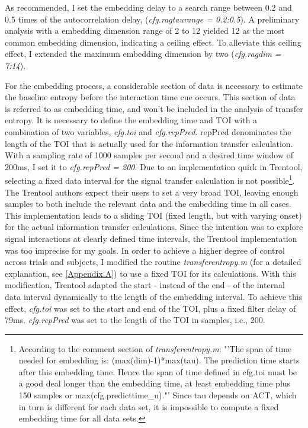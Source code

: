 As recommended, I set the embedding delay to a search range between 0.2 and 0.5 times of the autocorrelation delay, (\emph{cfg.ragtaurange = 0.2:0.5}).
A preliminary analysis with a embedding dimension range of 2 to 12 yielded 12 as the most common embedding dimension, indicating a ceiling effect.
To alleviate this ceiling effect, I extended the maximum embedding dimension by two (\emph{cfg.ragdim = 7:14}).

For the embedding process, a considerable section of data is necessary to estimate the baseline entropy before the interaction time cue occurs.
This section of data is referred to as embedding time, and won't be included in the analysis of transfer entropy.
It is necessary to define the embedding time and TOI with a combination of two variables, \emph{cfg.toi} and \emph{cfg.repPred}.
repPred denominates the length of the TOI that is actually used for the information transfer calculation.
With a sampling rate of 1000 samples per second and a desired time window of 200ms, I set it to \emph{cfg.repPred = 200}.
Due to an implementation quirk in Trentool, selecting a fixed data interval for the signal transfer calculation is not possible\footnote{According to the comment section of \emph{transferentropy.m}: "'The span of time needed for embedding is: (max(dim)-1)*max(tau). The prediction time starts after this embedding time. Hence the span of time defined in cfg.toi must be a good deal longer than the embedding time, at least embedding time plus 150 samples or max(cfg.predicttime\_u)."'
Since tau depends on ACT, which in turn is different for each data set, it is impossible to compute a fixed embedding time for all data sets.}. The Trentool authors expect their users to set a very broad TOI, leaving enough samples to both include the relevant data and the embedding time in all cases.
This implementation leads to a sliding TOI (fixed length, but with varying onset) for the actual information transfer calculations.
Since the intention was to explore signal interactions at clearly defined time intervals, the Trentool implementation was too imprecise for my goals.
In order to achieve a higher degree of control across trials and subjects, I modified the routine \emph{transferentropy.m} (for a detailed explanation, see \ref{Appendix.A}) to use a fixed TOI for its calculations.
With this modification, Trentool adapted the start - instead of the end - of the internal data interval dynamically to the length of the embedding interval.
To achieve this effect, \emph{cfg.toi} was set to the start and end of the TOI, plus a fixed filter delay of 79ms.
\emph{cfg.repPred} was set to the length of the TOI in samples, i.e., 200.

